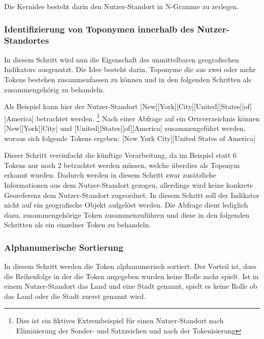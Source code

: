 				Die Kernidee besteht darin den Nutzer-Standort in N-Gramme zu zerlegen. 


		  	\subsubsection{Identifizierung von Toponymen innerhalb des Nutzer-Standortes}
		  		
		  		In diesem Schritt wird nun die Eigenschaft des unmittelbaren geografischen Indikators ausgenutzt.
		  		Die Idee besteht darin, Toponyme die aus zwei oder mehr Tokens bestehen zusammenfassen zu können und in den folgenden Schritten als zusammengehörig zu behandeln.

		  		Als Beispiel kann hier der Nutzer-Standort [New][York][City][United][States][of][America] betrachtet werden. \footnote{Dies ist ein fiktives Extrembeispiel für einen Nutzer-Standort nach Eliminierung der Sonder- und Satzzeichen und nach der Tokenisierung}
		  		Nach einer Abfrage auf ein Ortsverzeichnis können [New][York][City] und [United][States][of][America] zusammengeführt werden, woraus sich folgende Tokens ergeben:
		  		[New York City][United States of America]   

		  		Dieser Schritt vereinfacht die künftige Verarbeitung, da im Beispiel statt 6 Tokens nur noch 2 betrachtet werden müssen, welche überdies als Toponym erkannt wurden.
		  		Dadurch werden in diesem Schritt zwar zusätzliche Informationen aus dem Nutzer-Standort gezogen, allerdings wird keine konkrete Georeferenz dem Nutzer-Standort zugeordnet.
		  		In diesem Schritt soll der Indikator nicht auf ein geografische Objekt aufgelöst werden. 
		  		Die Abfrage dient lediglich dazu, zusammengehörige Token zusammenzuführen und diese in den folgenden Schritten als ein einzelner Token zu behandeln. 




		  	\subsubsection{Alphanumerische Sortierung}

		  		In diesem Schritt werden die Token alphanumerisch sortiert. 
		  		Der Vorteil ist, dass die Reihenfolge in der die Token angegeben wurden keine Rolle mehr spielt. 
		  		Ist in einem Nutzer-Standort das Land und eine Stadt genannt, spielt es keine Rolle ob das Land oder die Stadt zuerst genannt wird. 

